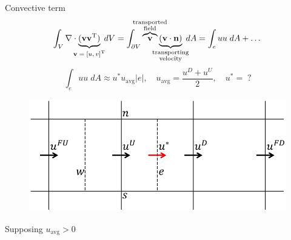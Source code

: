 \documentclass{beamer}
\begin{document}
\begin{frame}{Convective term}
\vspace{-0.5cm}
\begin{equation*}
	\int_V \nabla \cdot \underbrace{(\mathbf{v} 
	\mathbf{v}^\mathrm{T})}_{\text{\makebox[0pt]{$\mathbf{v} = 
	[u,v]^\mathrm{T}$}}} \; dV = \int_{\partial V} 
	\overbrace{\mathbf{v}}^{\substack{\text{\makebox[0pt]{transported}} 
	\\ \text{\makebox[0pt]{field}}}} \underbrace{(\mathbf{v} \cdot 
	\mathbf{n})}_{\substack{\text{\makebox[0pt]{transporting}} \\
	\text{\makebox[0pt]{velocity}}}} \; dA = \int_e uu \; dA + \dots
\end{equation*}
\begin{equation*}
\int_e uu \; dA \approx u^* u_\text{avg} |e|, \quad 
u_\text{avg} = \frac{u^D + u^U}{2}, \quad u^* = \; ?
\end{equation*}
\begin{minipage}[t]{0.79\textwidth}
\begin{figure}
	\centering
	\includegraphics[height=0.4\textheight]{trecelle_faces.pdf}
\end{figure}
\end{minipage}
\begin{minipage}[t]{0.19\textwidth}
	\vspace*{1cm}
	Supposing $u_\text{avg} > 0$
\end{minipage}
\end{frame}
\end{document}
